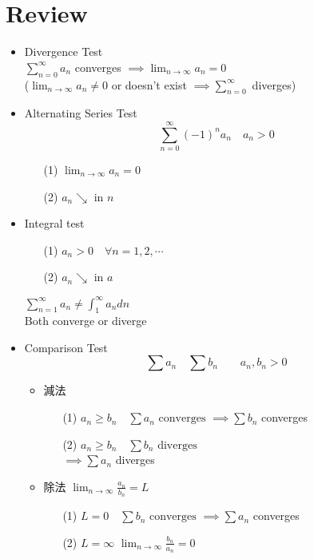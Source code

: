 \section{Review}
\begin{itemize}
\item Divergence Test\\
\(\displaystyle \sum^{\infty}_{n = 0} a_n\) converges \(\implies \displaystyle \lim_{n \to \infty} a_n = 0\)\\
(\(\displaystyle \lim_{n \to \infty} a_n \neq 0\) or doesn't exist \(\implies \displaystyle \sum^{\infty}_{n = 0}\) diverges)
\item Alternating Series Test
\[\displaystyle \sum^{\infty}_{n = 0} (-1)^n a_n \quad a_n > 0\]
\begin{itemize}
\item[(1)] \(\displaystyle \lim_{n \to \infty} a_n = 0\)
\item[(2)] \(a_n \searrow\) in \(n\)
\end{itemize}
\item Integral test
\begin{itemize}
\item[(1)] \(a_n > 0 \quad \forall n = 1, 2, \cdots\)
\item[(2)] \(a_n \searrow \) in \(a\)
\end{itemize}
\(\displaystyle \sum^{\infty}_{n = 1} a_n \neq \int^{\infty}_1 a_n dn\)\\
Both converge or diverge
\item Comparison Test
\[\displaystyle \sum a_n \quad \sum b_n \quad \quad a_n, b_n > 0\]
\begin{itemize}
\item 減法
\begin{itemize}
\item[(1)] \(\displaystyle a_n \geq b_n \quad \sum a_n \text{ converges } \implies \sum b_n\) converges
\item[(2)] \(\displaystyle a_n \geq b_n \quad \sum b_n \text{ diverges }\)\\
\(\implies \sum a_n\) diverges
\end{itemize}
\item 除法
\(\displaystyle \lim_{n \to \infty} \frac{a_n}{b_n} = L\)
\begin{itemize}
\item[(1)] \( L = 0 \quad \displaystyle \sum b_n \text{ converges } \implies \sum a_n\) converges
\item[(2)] \( L = \infty\) \quad \(\displaystyle \lim_{n \to \infty} \frac{b_n}{a_n} = 0\)

\end{itemize}
\end{itemize}
\end{itemize}
